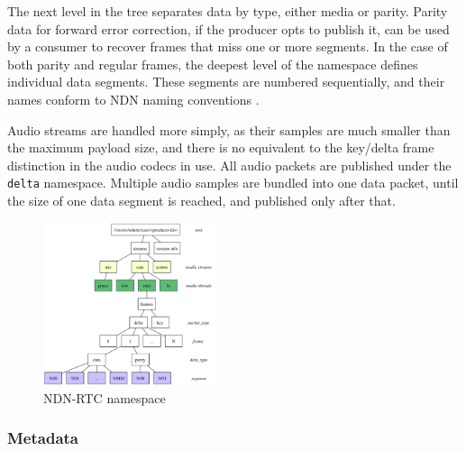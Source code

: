 \documentclass{icn/sig-alternate-2013} %
\newcommand{\ndnrtcName}{NDN-RTC} %
\begin{document}

The next level in the tree separates data by type, either media or parity. Parity data for forward error correction, if the producer opts to publish it, can be used by a consumer to recover frames that miss one or more segments. 
In the case of both parity and regular frames, the deepest level of the namespace defines individual data segments. These segments are numbered sequentially, and their names conform to NDN naming conventions \cite{ndnnaming}.

Audio streams are handled more simply, as their samples are much smaller than the maximum payload size, and there is no equivalent to the key/delta frame distinction in the audio codecs in use. All audio packets are published under the \texttt{delta} namespace. Multiple audio samples are bundled into one data packet, until the size of one data segment is reached, and published only after that.

\begin{figure}[t!]
\centering
\includegraphics[width=0.45\textwidth]{namespace}
\caption{\ndnrtcName{} namespace}
\label{fig:namespace}
\end{figure}

\subsubsection{Metadata} 
\end{document}
